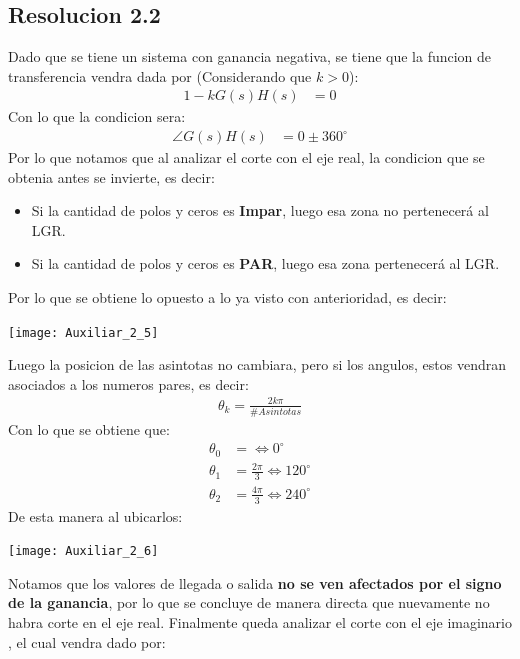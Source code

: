 \documentclass[
  11pt,
  letterpaper,
   addpoints,
   answers
  ]{exam}
\begin{document}
\begin{questions}
\begin{solution}
\subsection*{Resolucion 2.2}
Dado que se tiene un sistema con ganancia negativa, se tiene que la funcion de transferencia vendra dada por (Considerando que $k>0$):
\begin{align}
    1-kG(s)H(s) &= 0
\end{align}
Con lo que la condicion sera:
\begin{align}
    \angle G(s)H(s) &= 0 \pm 360^{\circ} 
\end{align}
Por lo que notamos que al analizar el corte con el eje real, la condicion que se obtenia antes se invierte, es decir:
\begin{itemize}
    \item Si la cantidad de polos y ceros es \textbf{Impar}, luego esa zona no pertenecerá al LGR.
    \item Si la cantidad de polos y ceros es \textbf{PAR}, luego esa zona pertenecerá al LGR.
\end{itemize}
Por lo que se obtiene lo opuesto a lo ya visto con anterioridad, es decir:
\begin{center}
    \texttt{[image: Auxiliar\_2\_5]}
  \end{center}
Luego la posicion de las asintotas no cambiara, pero si los angulos, estos vendran asociados a los numeros pares, es decir:
\begin{align}
    \theta_{k} = \frac{2k \pi}{\#Asintotas}
\end{align}
Con lo que se obtiene que:
\begin{align}
    \theta_{0} &=   \Leftrightarrow 0^{\circ} \\
    \theta_{1} &=   \frac{2\pi}{3} \Leftrightarrow 120^{\circ} \\
    \theta_{2} &=  \frac{4\pi}{3} \Leftrightarrow 240^{\circ} 
\end{align}
De esta manera al ubicarlos:
\begin{center}
    \texttt{[image: Auxiliar\_2\_6]}
  \end{center}
Notamos que los valores de llegada o salida \textbf{no se ven afectados por el signo de la ganancia}, por lo que se concluye de manera directa que nuevamente no habra corte en el eje real. Finalmente queda analizar el corte con el eje imaginario , el cual vendra dado por:
\begin{align}

\end{align}
\end{solution}
\end{questions}
\end{document}
